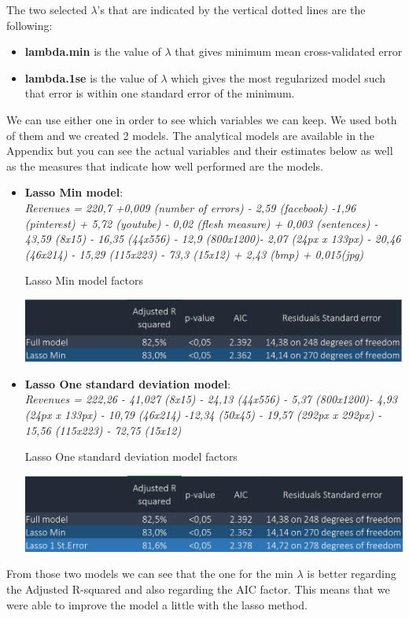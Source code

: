 \documentclass{book}
\begin{document}
The two selected $\lambda$’s that are indicated by the vertical dotted lines are the following:
\begin{itemize}
 \item \textbf{lambda.min} is the value of $\lambda$ that gives minimum mean cross-validated error
 \item \textbf{lambda.1se} is the value of $\lambda$ which gives the most regularized model such that error is within one standard error of the minimum.
 \end{itemize}  
We can use either one in order to see which variables we can keep. We used both of them and we created 2 models. The analytical models are available in the Appendix but you can see the actual variables and their estimates below as well as the measures that indicate how well performed are the models.
\begin{itemize}
\item \textbf{Lasso Min model}:\\
\textit{Revenues = 220,7 +0,009 (number of errors) - 2,59 (facebook) -1,96 (pinterest) + 5,72 (youtube) - 0,02 (flesh measure) + 0,003 (sentences) - 43,59 (8x15) - 16,35 (44x556) - 12,9 (800x1200)- 2,07 (24px x 133px) - 20,46 (46x214) - 15,29 (115x223) - 73,3 (15x12) + 2,43 (bmp) + 0,015(jpg)}\\
\begin{table}[H]
\centering
\caption{Lasso Min model factors}
\includegraphics[scale=0.6]{../R/photos/0001_f_f3.PNG} 
\end{table}

\item \textbf{Lasso One standard deviation model}:\\
\textit{Revenues = 222,26 - 41,027 (8x15) - 24,13 (44x556) - 5,37 (800x1200)- 4,93 (24px x 133px) - 10,79 (46x214) -12,34 (50x45) - 19,57 (292px x 292px) - 15,56 (115x223) - 72,75 (15x12)}
\begin{table}[H]
\centering
\caption{Lasso One standard deviation model factors}
\includegraphics[scale=0.6]{../R/photos/0001_f_f3_f4.PNG} 
\end{table}
\end{itemize}
From those two models we can see that the one for the min $\lambda$ is better regarding the Adjusted R-squared and also regarding the AIC factor. This means that we were able to improve the model a little with the lasso method.
\end{document}
